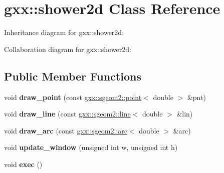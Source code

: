 \hypertarget{classgxx_1_1shower2d}{}\section{gxx\+:\+:shower2d Class Reference}
\label{classgxx_1_1shower2d}


Inheritance diagram for gxx\+:\+:shower2d\+:


Collaboration diagram for gxx\+:\+:shower2d\+:
\subsection*{Public Member Functions}
\begin{DoxyCompactItemize}
\item 
void {\bfseries draw\+\_\+point} (const \hyperlink{structgxx_1_1sgeom2_1_1point}{gxx\+::sgeom2\+::point}$<$ double $>$ \&pnt)\hypertarget{classgxx_1_1shower2d_aaa552a3d17c5cf07b8cb4d6a6e4f6524}{}\label{classgxx_1_1shower2d_aaa552a3d17c5cf07b8cb4d6a6e4f6524}

\item 
void {\bfseries draw\+\_\+line} (const \hyperlink{structgxx_1_1sgeom2_1_1line}{gxx\+::sgeom2\+::line}$<$ double $>$ \&lin)\hypertarget{classgxx_1_1shower2d_a391fa4f2321d2607b9b1f672f8477312}{}\label{classgxx_1_1shower2d_a391fa4f2321d2607b9b1f672f8477312}

\item 
void {\bfseries draw\+\_\+arc} (const \hyperlink{structgxx_1_1sgeom2_1_1arc}{gxx\+::sgeom2\+::arc}$<$ double $>$ \&arc)\hypertarget{classgxx_1_1shower2d_a1c68ed8bf17f9f5ded0d53fc91f56784}{}\label{classgxx_1_1shower2d_a1c68ed8bf17f9f5ded0d53fc91f56784}

\item 
void {\bfseries update\+\_\+window} (unsigned int w, unsigned int h)\hypertarget{classgxx_1_1shower2d_a7cd5ed742aa873035d6c9a3d31605394}{}\label{classgxx_1_1shower2d_a7cd5ed742aa873035d6c9a3d31605394}

\item 
void {\bfseries exec} ()\hypertarget{classgxx_1_1shower2d_a3789d91268aec71547ee9eb58ce73250}{}\label{classgxx_1_1shower2d_a3789d91268aec71547ee9eb58ce73250}

\end{DoxyCompactItemize}

